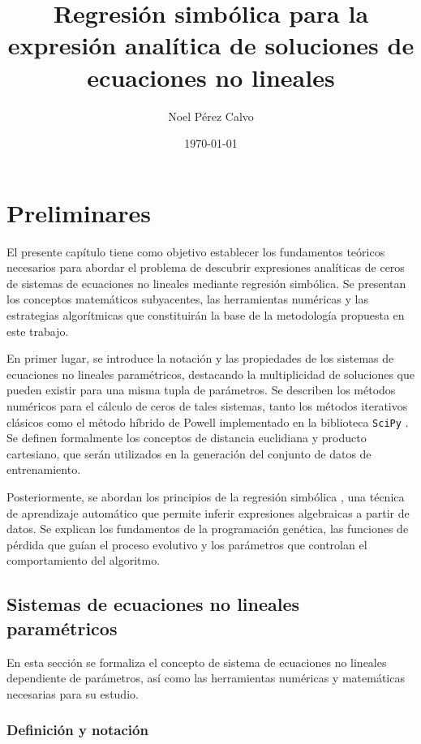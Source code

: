 \documentclass[12pt,a4paper]{article}
\title{Regresión simbólica para la expresión analítica de soluciones de ecuaciones no lineales}
\author{Noel Pérez Calvo}
\date{\today}
\begin{document}
\maketitle

\section*{Preliminares}

El presente capítulo tiene como objetivo establecer los fundamentos teóricos necesarios para abordar el problema de descubrir expresiones analíticas de ceros de sistemas de ecuaciones no lineales mediante regresión simbólica. Se presentan los conceptos matemáticos subyacentes, las herramientas numéricas y las estrategias algorítmicas que constituirán la base de la metodología propuesta en este trabajo.

En primer lugar, se introduce la notación y las propiedades de los sistemas de ecuaciones no lineales paramétricos, destacando la multiplicidad de soluciones que pueden existir para una misma tupla de parámetros. Se describen los métodos numéricos para el cálculo de ceros de tales sistemas, tanto los métodos iterativos clásicos como el método híbrido de Powell implementado en la biblioteca \texttt{SciPy} \cite{virtanen2020scipy}. Se definen formalmente los conceptos de distancia euclidiana y producto cartesiano, que serán utilizados en la generación del conjunto de datos de entrenamiento.

Posteriormente, se abordan los principios de la regresión simbólica \cite{koza1992genetic}, una técnica de aprendizaje automático que permite inferir expresiones algebraicas a partir de datos. Se explican los fundamentos de la programación genética, las funciones de pérdida que guían el proceso evolutivo y los parámetros que controlan el comportamiento del algoritmo.

\subsection*{Sistemas de ecuaciones no lineales paramétricos}

En esta sección se formaliza el concepto de sistema de ecuaciones no lineales dependiente de parámetros, así como las herramientas numéricas y matemáticas necesarias para su estudio.

\subsubsection*{Definición y notación}
\end{document}
